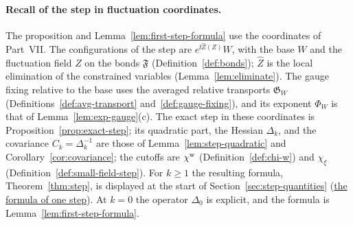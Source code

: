 \paragraph{Recall of the step in fluctuation coordinates.} The proposition and Lemma~\ref{lem:first-step-formula} use the coordinates of Part~VII. The configurations of the step are $e^{\ii\hat Z(Z)}W$, with the base $W$ and the fluctuation field $Z$ on the bonds $\mathfrak F$ (Definition~\ref{def:bonds}); $\hat Z$ is the local elimination of the constrained variables (Lemma~\ref{lem:eliminate}). The gauge fixing relative to the base uses the averaged relative transports $\mathfrak G_W$ (Definitions~\ref{def:avg-transport} and~\ref{def:gauge-fixing}), and its exponent $\Phi_W$ is that of Lemma~\ref{lem:exp-gauge}(c). The exact step in these coordinates is Proposition~\ref{prop:exact-step}; its quadratic part, the Hessian $\Delta_k$, and the covariance $C_k=\Delta_k^{-1}$ are those of Lemma~\ref{lem:step-quadratic} and Corollary~\ref{cor:covariance}; the cutoffs are $\chi^{\rm w}$ (Definition~\ref{def:chi-w}) and $\chi_\xi$ (Definition~\ref{def:small-field-step}). For $k\ge1$ the resulting formula, Theorem~\ref{thm:step}, is displayed at the start of Section~\ref{sec:step-quantities} (\hyperref[par:step-formula]{the formula of one step}). At $k=0$ the operator $\Delta_0$ is explicit, and the formula is Lemma~\ref{lem:first-step-formula}.


